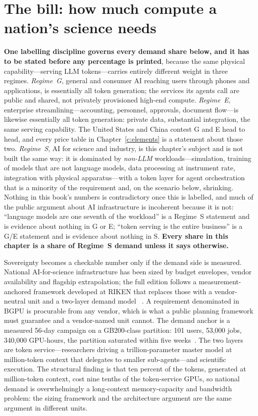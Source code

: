 \section{The bill: how much compute a nation's science needs}

\textbf{One labelling discipline governs every demand share below, and it has to be stated before any percentage is printed}, because the same physical capability---serving LLM tokens---carries entirely different weight in three regimes. \emph{Regime~G}, general and consumer AI reaching users through phones and applications, is essentially all token generation; the services its agents call are public and shared, not privately provisioned high-end compute. \emph{Regime~E}, enterprise streamlining---accounting, personnel, approvals, document flow---is likewise essentially all token generation: private data, substantial integration, the same serving capability. The United States and China contest G and E head to head, and every price table in Chapter~\ref{c:elements} is a statement about those two. \emph{Regime~S}, AI for science and industry, is this chapter's subject and is not built the same way: it is dominated by \emph{non-LLM} workloads---simulation, training of models that are not language models, data processing at instrument rate, integration with physical apparatus---with a token layer for agent orchestration that is a minority of the requirement and, on the scenario below, shrinking. Nothing in this book's numbers is contradictory once this is labelled, and much of the public argument about AI infrastructure is incoherent because it is not: ``language models are one seventh of the workload'' is a Regime~S statement and is evidence about nothing in G or E; ``token serving is the entire business'' is a G/E statement and is evidence about nothing in S. \textbf{Every share in this chapter is a share of Regime~S demand unless it says otherwise.}

Sovereignty becomes a checkable number only if the demand side is measured. National AI-for-science infrastructure has been sized by budget envelopes, vendor availability and flagship extrapolation; the full edition follows a measurement-anchored framework developed at RIKEN that replaces those with a vendor-neutral unit and a two-layer demand model~\cite{ai4s-framework} . A requirement denominated in BGPU is procurable from any vendor, which is what a public planning framework must guarantee and a vendor-named unit cannot. The demand anchor is a measured 56-day campaign on a GB200-class partition: 101 users, 53,000 jobs, 340,000 GPU-hours, the partition saturated within five weeks~\cite{ai4s-framework}. The two layers are token service---researchers driving a trillion-parameter master model at million-token context that delegates to smaller sub-agents---and scientific execution. The structural finding is that ten percent of the tokens, generated at million-token context, cost nine tenths of the token-service GPUs, so national demand is overwhelmingly a long-context memory-capacity and bandwidth problem: the sizing framework and the architecture argument are the same argument in different units.


